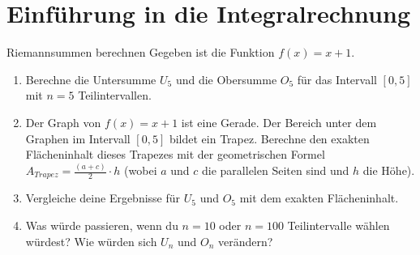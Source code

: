 \section{Einführung in die Integralrechnung}
\label{sec:integralrechnung} %
\begin{aufgabenumgebung}{Riemannsummen berechnen}
Gegeben ist die Funktion $f(x) = x+1$.
\begin{enumerate}
    \item Berechne die Untersumme $U_5$ und die Obersumme $O_5$ für das Intervall $[0,5]$ mit $n=5$ Teilintervallen.
    \item Der Graph von $f(x)=x+1$ ist eine Gerade. Der Bereich unter dem Graphen im Intervall $[0,5]$ bildet ein Trapez. Berechne den exakten Flächeninhalt dieses Trapezes mit der geometrischen Formel $A_{Trapez} = \frac{(a+c)}{2} \cdot h$ (wobei $a$ und $c$ die parallelen Seiten sind und $h$ die Höhe).
    \item Vergleiche deine Ergebnisse für $U_5$ und $O_5$ mit dem exakten Flächeninhalt.
    \item Was würde passieren, wenn du $n=10$ oder $n=100$ Teilintervalle wählen würdest? Wie würden sich $U_n$ und $O_n$ verändern?
\end{enumerate}
\end{aufgabenumgebung}

